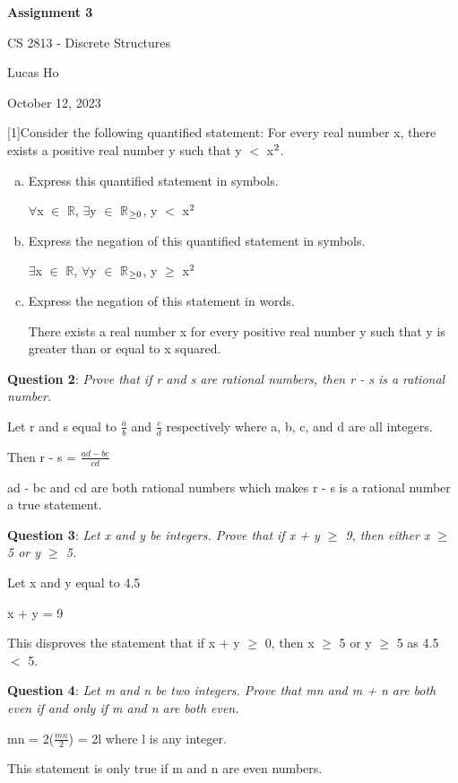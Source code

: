 \documentclass{article} %
\newcommand{\question}[2][]{\begin{flushleft}
        \textbf{Question #1}: \textit{#2}

\end{flushleft}}
\newcommand{\maketitletwo}[2][]{\begin{center}
        \Large{\textbf{Assignment 3}
            
            CS 2813 - Discrete Structures} %
        \vspace{5pt}
        
        \normalsize{Lucas Ho  %
        
        October 12, 2023}        %
        \vspace{15pt}
        
\end{center}}
\begin{document}
    \maketitletwo[5]  %
    
    \question[1]{Consider the following quantified statement: For every real number x, there exists a positive real number y such that y $<$ x$\textsuperscript{2}$.}

    \begin{enumerate}[(a)]
      \item{Express this quantified statement in symbols.}
      
      $\forall$x $\in$ $\mathbb{R}$, $\exists$y $\in$ $\mathbb{R}$$\textsubscript{$\geq$0}$, y $<$ x$\textsuperscript{2}$
      \item {Express the negation of this quantified statement in symbols.}
      
      $\exists$x $\in$ $\mathbb{R}$, $\forall$y $\in$ $\mathbb{R}$$\textsubscript{$\geq$0}$, y $\geq$ x$\textsuperscript{2}$
      \item {Express the negation of this statement in words.}
      
      There exists a real number x for every positive real number y such that y is greater than or equal to x squared.
    \end{enumerate}
    
    \question[2]{Prove that if r and s are rational numbers, then r - s is a rational number.}

    Let r and s equal to $\frac{a}{b}$ and $\frac{c}{d}$ respectively where a, b, c, and d are all integers.

    Then r - s = $\frac{ad - bc}{cd}$

    ad - bc and cd are both rational numbers which makes r - s is a rational number a true statement.

    \question[3]{Let x and y be integers. Prove that if x + y $\geq$ 9, then either x $\geq$ 5 or y $\geq$ 5.}

    Let x and y equal to 4.5

    x + y = 9

    This disproves the statement that if x + y $\geq$ 0, then x $\geq$ 5 or y $\geq$ 5 as 4.5 $<$ 5.

    \question[4]{Let m and n be two integers. Prove that mn and m + n are both even if and only
    if m and n are both even.}

    mn = 2($\frac{mn}{2}$) = 2l where l is any integer.
    
    This statement is only true if m and n are even numbers.
\end{document}
